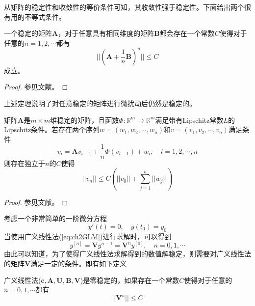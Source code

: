 从矩阵的稳定性和收敛性的等价条件可知，其收敛性强于稳定性。下面给出两个很有用的不等式条件。%
\begin{theorem}[稳定矩阵的鲁棒性]
一个稳定的矩阵$\bm{A}$，对于任意具有相同维度的矩阵$\bm{B}$都会存在一个常数$C$使得对于任意的$n=1,2,\cdots$都有
\begin{equation}
||\left(\bm{A}+\frac{1}{n}\bm{B}\right)^n||\le C
\end{equation}
成立。
\end{theorem}%
\begin{proof}
参见文献。
\end{proof}
上述定理说明了对任意稳定的矩阵进行微扰动后仍然是稳定的。

\begin{theorem}
矩阵$\bm{A}$是$m\times m$维稳定的矩阵，且函数$\Phi:\mathbb{R}^{m}\to\mathbb{R}^{m}$满足带有Lipschitz常数$L$的Lipschitz条件。若存在两个序列$w=(w_1,w_2,\cdots,w_n)$和$v=(v_1,v_2,\cdots,v_n)$满足条件
\begin{equation}
v_i=\bm{A}v_{i-1}+\frac{1}{n}\Phi(v_{i-1})+w_i,\quad i=1,2,\cdots,n
\end{equation}
则存在独立于$n$的$C$使得
\begin{equation}
||v_n||\le C\left(||v_0||+\sum_{j=1}^{n}||w_j||\right)
\end{equation}
\end{theorem}%
\begin{proof}
参见文献。
\end{proof}

考虑一个非常简单的一阶微分方程
\begin{equation}
y'(t)=0,\quad y(t_0)=y_0
\end{equation}
当使用广义线性法(\ref{eq:ch2GLM})进行求解时，可以得到
\begin{equation}
y^{[n]}=\bm{V}y^{n-1}=\bm{V}^ny^{[0]},\quad n=0,1,\cdots
\end{equation}
由此可以知道，为了使得广义线性法求解得到的数值解稳定，则需要对广义线性法的矩阵$\bm{V}$满足一定的条件。即有如下定义
\begin{definition}[零稳定性]
广义线性法($\bm{c},\bm{A},\bm{U},\bm{B},\bm{V}$)是零稳定的\cite{Jackiewicz2009,Burrage1995,Butcher2008}，如果存在一个常数$C$使得对于任意的$n=0,1,\cdots$都有
\begin{equation}
||\bm{V}^n||\le C
\end{equation}
\end{definition}%

